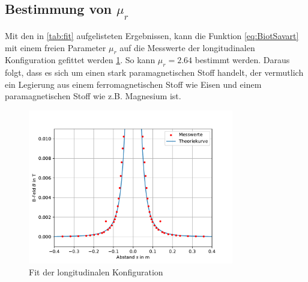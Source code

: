 \documentclass[11pt, a4paper]{article}
\begin{document}
    \subsection{Bestimmung von $\mu_r$}
    Mit den in \ref{tab:fit} aufgelisteten Ergebnissen, kann die Funktion \ref{eq:BiotSavart} mit einem freien Parameter $\mu_r$ auf die Messwerte der longitudinalen Konfiguration gefittet werden \ref{fig:murfit}. So kann $\mu_r = 2.64$ bestimmt werden.
    Daraus folgt, dass es sich um einen stark paramagnetischen Stoff handelt, der vermutlich ein Legierung aus einem ferromagnetischen Stoff wie Eisen und einem paramagnetischen Stoff wie z.B. Magnesium ist.
    \begin{figure}
        \centering
        \includegraphics[width=0.8\textwidth]{mur.pdf}
        \caption{Fit der longitudinalen Konfiguration}
        \label{fig:murfit}
    \end{figure}
\end{document}
